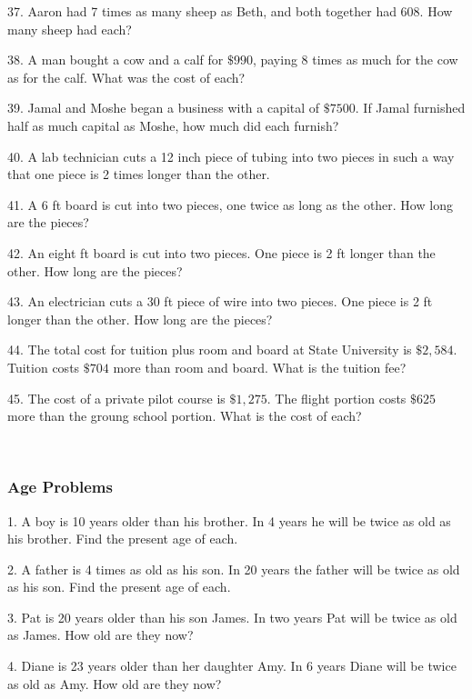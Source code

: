 \documentclass[11pt]{book}
\theoremstyle{definition}  %
\begin{document}
37. Aaron had 7 times as many sheep as Beth, and both together had 608. How many sheep had each?

\pagebreak

38. A man bought a cow and a calf for $\$990$, paying 8 times as much
for the cow as for the calf. What was the cost of each?

39. Jamal and Moshe began a business with a capital of $\$7500$. If
Jamal furnished half as much capital as
Moshe, how much did each furnish?

40. A lab technician cuts a 12 inch piece of tubing into two pieces in such a
way that one piece is 2 times longer than the other.

41. A 6 ft board is cut into two pieces, one twice as long as the other. How
long are the pieces?

42. An eight ft board is cut into two pieces. One piece is 2 ft longer than
the other. How long are the pieces?

43. An electrician cuts a 30 ft piece of wire into two pieces. One piece is 2
ft longer than the other. How long are the pieces?

44. The total cost for tuition plus room and board at State University is
$\$2,584$. Tuition costs $\$704$ more than
room and board. What is the tuition fee?

45. The cost of a private pilot course is $\$1,275$. The flight
portion costs $\$625$ more than the groung
school portion. What is the cost of each?

\vspace{4in}
~

\pagebreak

	\subsubsection{Age Problems}\par

1. A boy is 10 years older than his brother. In 4 years he will be twice as
old as his brother. Find the present age of each.

2. A father is 4 times as old as his son. In 20 years the father will be
twice as old as his son. Find the present age of each.

3. Pat is 20 years older than his son James. In two years Pat will be twice as
old as James. How old are they now?

4. Diane is 23 years older than her daughter Amy. In 6 years Diane will be
twice as old as Amy. How old are they now?
\end{document}
